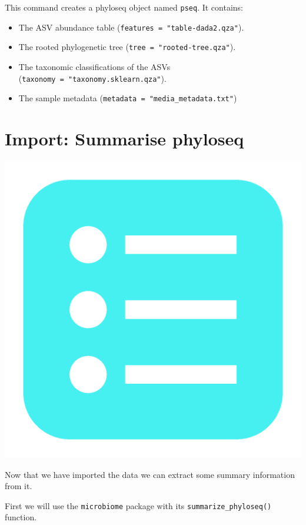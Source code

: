 \documentclass[
]{book}
\providecommand{\tightlist}{%
  \setlength{\itemsep}{0pt}\setlength{\parskip}{0pt}}
\begin{document}
This command creates a phyloseq object named \texttt{pseq}. It contains:

\begin{itemize}
\tightlist
\item
  The ASV abundance table (\texttt{features\ =\ "table-dada2.qza"}).
\item
  The rooted phylogenetic tree (\texttt{tree\ =\ "rooted-tree.qza"}).
\item
  The taxonomic classifications of the ASVs (\texttt{taxonomy\ =\ "taxonomy.sklearn.qza"}).
\item
  The sample metadata (\texttt{metadata\ =\ "media\_metadata.txt"})
\end{itemize}

\hypertarget{import-summarise-phyloseq}{%
\section{Import: Summarise phyloseq}\label{import-summarise-phyloseq}}

\includegraphics{figures/list_blue.png}

Now that we have imported the data we can extract some summary information from it.

First we will use the \texttt{microbiome} package with its \texttt{summarize\_phyloseq()} function.
\end{document}
